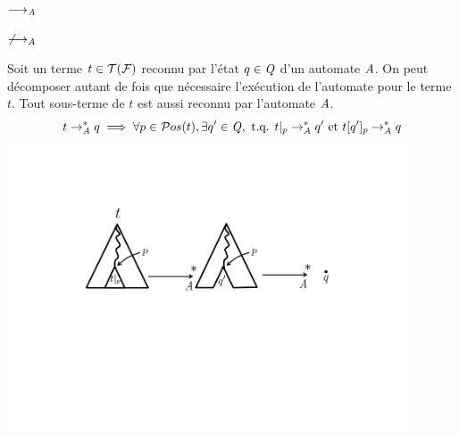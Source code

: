 \begin{example}
  \begin{center}
    $\longrightarrow_\mathit A$
    $\not\longrightarrow_\mathit A$
  \end{center}
\end{example}

\begin{property}
  \label{prop:execution}
  Soit un terme $t \in \mathcal{T(F)} $ reconnu par l'état $q \in \mathit Q$ d'un automate $\mathit A$. 
  On peut décomposer autant de fois que nécessaire l'exécution de l'automate pour le terme $t$.
  Tout sous-terme de $t$ est aussi reconnu par l'automate $\mathit A$.
  \[t \rightarrow_\mathit A^* q \; \Longrightarrow \; \forall p \in \mathcal{ P}os(t), \exists q' \in \mathit Q, \mbox{ t.q. } t|_p \rightarrow_\mathit A^* q' \mbox{ et } t[q']_p \rightarrow_\mathit A^* q\]
  \includegraphics[width=12cm]{2_prerequis/automate_rev}
\end{property}



